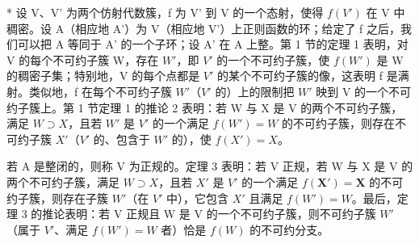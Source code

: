 * 设 V、V' 为两个仿射代数簇，f 为 V' 到 V 的一个态射，使得 \(f(V')\) 在 V 中稠密。设 A（相应地 A'）为 V（相应地 V'）上正则函数的环；给定了 f 之后，我们可以把 A 等同于 A' 的一个子环；设 A' 在 A 上整。第 1 节的定理 1 表明，对 V 的每个不可约子簇 W，存在 \(W'\)，即 \(V'\) 的一个不可约子簇，使 \(f(W')\) 是 W 的稠密子集；特别地，V 的每个点都是 \(V'\) 的某个不可约子簇的像，这表明 f 是满射。类似地，f 在每个不可约子簇 \(W'\)（\(V'\) 的）上的限制把 \(W'\) 映到 V 的一个不可约子簇上。第 1 节定理 1 的推论 2 表明：若 W 与 X 是 V 的两个不可约子簇，满足 \(W \supset X\)，且若 \(W'\) 是 \(V'\) 的一个满足 \(f(W') = W\) 的不可约子簇，则存在不可约子簇 \(X'\)（\(V'\) 的、包含于 \(W'\) 的），使 \(f(X') = X\)。

若 A 是整闭的，则称 V 为正规的。定理 3 表明：若 V 正规，若 W 与 X 是 V 的两个不可约子簇，满足 \(W \supset X\)，且若 \(X'\) 是 \(V'\) 的一个满足 \(f(\mathbf{X}') = \mathbf{X}\) 的不可约子簇，则存在子簇 \(W'\)（在 \(V'\) 中），它包含 \(X'\) 且满足 \(f(W') = W\)。最后，定理 3 的推论表明：若 V 正规且 W 是 V 的一个不可约子簇，则不可约子簇 \(W'\)（属于 \(V'\)、满足 \(f(W') = W\) 者）恰是 \(f(W)\) 的不可约分支。

